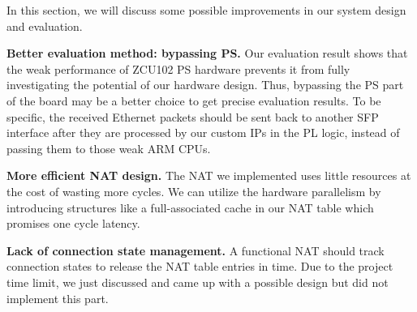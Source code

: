 
In this section, we will discuss some possible improvements in our system design and evaluation.

\textbf{Better evaluation method: bypassing PS.} Our evaluation result shows that the weak performance of ZCU102 PS hardware prevents it from fully investigating the potential of our hardware design. Thus, bypassing the PS part of the board may be a better choice to get precise evaluation results. To be specific, the received Ethernet packets should be sent back to another SFP interface after they are processed by our custom IPs in the PL logic, instead of passing them to those weak ARM CPUs.

\textbf{More efficient NAT design.} The NAT we implemented uses little resources at the cost of wasting more cycles. We can utilize the hardware parallelism by introducing structures like a full-associated cache in our NAT table which promises one cycle latency.

\textbf{Lack of connection state management.} A functional NAT should track connection states to release the NAT table entries in time. Due to the project time limit, we just discussed and came up with a possible design but did not implement this part. 